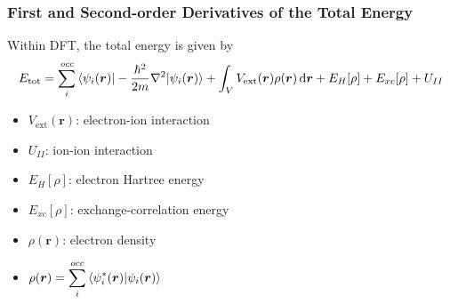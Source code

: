 \begin{frame}
  \frametitle{First and Second-order Derivatives of the Total Energy}
  Within DFT, the total energy is given by
  \begin{equation*}
    E_{\text{tot}} =
    \sum_{i}^{\textit{occ}}
    \braket{
      \psi_i(\boldsymbol{r})
      |-{\hbar^2\over2m}\nabla^2 |
      \psi_i(\boldsymbol{r})
    }
    +
    \int_{\tikzmark{int_space}V} V_{\text{ext}}(\boldsymbol{r}) \rho(\boldsymbol{r}) \,\mathrm{d}\boldsymbol{r}
    +
    E_H[\rho]
    +
    E_{xc}[\rho]
    +
    U_{II}
  \end{equation*}


  \begin{multicols}{2}
    \begin{itemize}
      \item $V_{\text{ext}}(\boldsymbol{r})$: electron-ion interaction
      \item $U_{II}$: ion-ion interaction
      \item $E_H[\rho]$: electron Hartree energy
      \item $E_{xc}[\rho]$: exchange-correlation energy
      \item $\rho(\boldsymbol{r})$: electron density
      \item[] $\displaystyle \rho(\boldsymbol{r}) = \sum_i^{occ} \braket{\psi_i^*(\boldsymbol{r}) |
          \psi_i(\boldsymbol{r})}$
    \end{itemize}
  \end{multicols}


\end{frame}
